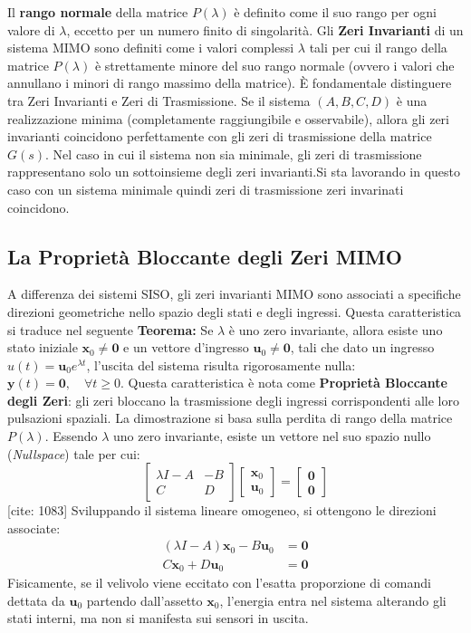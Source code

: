 Il \textbf{rango normale} della matrice $P(\lambda)$ è definito come il suo rango per ogni valore di $ \lambda$, eccetto per un numero finito di singolarità. 
Gli \textbf{Zeri Invarianti} di un sistema MIMO sono definiti come i valori complessi $\lambda$ tali per cui il rango della matrice $P(\lambda)$ è strettamente minore del suo rango normale (ovvero i valori che annullano i minori di rango massimo della matrice). È fondamentale distinguere tra Zeri Invarianti e Zeri di Trasmissione. Se il sistema $(A,B,C,D)$ è una realizzazione minima (completamente raggiungibile e osservabile), allora gli zeri invarianti coincidono perfettamente con gli zeri di trasmissione della matrice $G(s)$. Nel caso in cui il sistema non sia minimale, gli zeri di trasmissione rappresentano solo un sottoinsieme degli zeri invarianti.Si sta lavorando in questo caso con un sistema  minimale quindi zeri di trasmissione zeri invarinati coincidono.

\subsection{La Proprietà Bloccante degli Zeri MIMO}
A differenza dei sistemi SISO, gli zeri invarianti MIMO sono associati a specifiche direzioni geometriche nello spazio degli stati e degli ingressi. Questa caratteristica si traduce nel seguente \textbf{Teorema:} Se $\lambda$ è uno zero invariante, allora esiste uno stato iniziale $\mathbf{x}_0 \neq \mathbf{0}$ e un vettore d'ingresso $\mathbf{u}_0 \neq \mathbf{0}$, tali che dato un ingresso $u(t) = \mathbf{u}_0 e^{\lambda t}$, l'uscita del sistema risulta rigorosamente nulla: $\mathbf{y}(t) = \mathbf{0}, \quad \forall t \ge 0$. Questa caratteristica è nota come \textbf{Proprietà Bloccante degli Zeri}: gli zeri bloccano la trasmissione degli ingressi corrispondenti alle loro pulsazioni spaziali. 
La dimostrazione si basa sulla perdita di rango della matrice $P(\lambda)$. Essendo $\lambda$ uno zero invariante, esiste un vettore nel suo spazio nullo (\textit{Nullspace}) tale per cui:
\begin{equation}
\begin{bmatrix} \lambda I - A & -B \\ C & D \end{bmatrix} \begin{bmatrix} \mathbf{x}_0 \\ \mathbf{u}_0 \end{bmatrix} = \begin{bmatrix} \mathbf{0} \\ \mathbf{0} \end{bmatrix}
\end{equation} [cite: 1083]
Sviluppando il sistema lineare omogeneo, si ottengono le direzioni associate:
\begin{align}
(\lambda I - A)\mathbf{x}_0 - B\mathbf{u}_0 &= \mathbf{0} \\
C\mathbf{x}_0 + D\mathbf{u}_0 &= \mathbf{0}
\end{align} 
Fisicamente, se il velivolo viene eccitato con l'esatta proporzione di comandi dettata da $\mathbf{u}_0$ partendo dall'assetto $\mathbf{x}_0$, l'energia entra nel sistema alterando gli stati interni, ma non si manifesta sui sensori in uscita.


